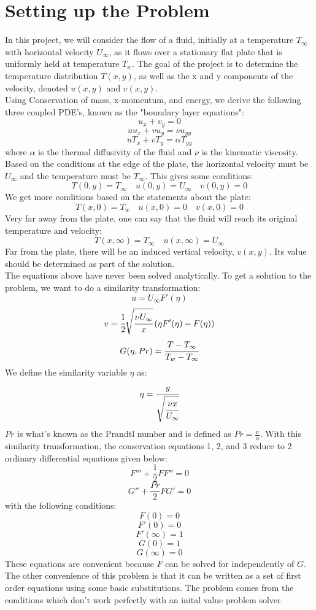 \documentclass{article}
\def\beq{\begin{equation}}
\def\eeq{\end{equation}}
\begin{document}
\section*{Setting up the Problem}
In this project, we will consider the flow of a fluid, initially at a temperature $T_{\infty}$ with horizontal velocity $U_{\infty}$, as it flows over a stationary flat plate that is uniformly held at temperature $T_w$. The goal of the project is to determine the temperature distribution $T(x,y)$, as well as the x and y components of the velocity, denoted $u(x,y)$ and $v(x,y)$.\\
Using Conservation of mass, x-momentum, and energy, we derive the following three coupled PDE's, known as the "boundary layer equations":
\beq u_x+v_y=0\eeq
\beq uu_x+vu_y=\nu u_{yy}\eeq
\beq uT_x+vT_y=\alpha T_{yy}\eeq
where $\alpha$ is the thermal diffusivity of the fluid and $\nu$ is the kinematic viscosity. Based on the conditions at the edge of the plate, the horizontal velocity must be $U_\infty$ and the temperature must be $T_\infty$. This gives some conditions:
\beq T(0,y)=T_\infty\quad u(0,y)=U_\infty\quad v(0,y)=0\eeq
We get more conditions based on the statements about the plate:
\beq T(x,0)=T_w\quad u(x,0)=0\quad v(x,0)=0\eeq
Very far away from the plate, one can say that the fluid will reach its original temperature and velocity:
\beq T(x,\infty)=T_\infty\quad u(x,\infty)=U_\infty\eeq
Far from the plate, there will be an induced vertical velocity, $v(x,y)$. Its value should be determined as part of the solution.\\
The equations above have never been solved analytically. To get a solution to the problem, we want to do a similarity transformation:
\beq u=U_\infty F'(\eta)\eeq
\beq v=\cfrac{1}{2}\sqrt{\cfrac{\nu U_\infty}{x}}\left (\eta F'(\eta)-F(\eta)\right )\eeq
\beq G(\eta,Pr)=\cfrac{T-T_\infty}{T_w-T_\infty}\eeq
We define the similarity variable $\eta$ as:
\beq \eta=\cfrac{y}{\sqrt{\cfrac{\nu x}{U_\infty}}}\eeq
$Pr$ is what's known as the Prandtl number and is defined as $Pr=\frac{\nu}{\alpha}$. With this similarity transformation, the conservation equations 1, 2, and 3 reduce to 2 ordinary differential equations given below:
\beq F'''+\frac{1}{2}FF''=0\eeq
\beq G''+\frac{Pr}{2}FG'=0\eeq
with the following conditions:
\beq F(0)=0\eeq
\beq F'(0)=0\eeq
\beq F'(\infty)=1\eeq
\beq G(0)=1\eeq
\beq G(\infty)=0\eeq
These equations are convenient because $F$ can be solved for independently of $G$. The other convenience of this problem is that it can be written as a set of first order equations using some basic substitutions. The problem comes from the conditions which don't work perfectly with an inital value problem solver. 
\end{document}
